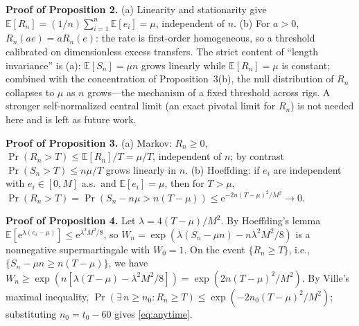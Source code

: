 \documentclass[journal]{IEEEtran}
\newcommand{\E}{\mathbb{E}}
\newcommand{\Prb}{\Pr}
\begin{document}
\textbf{Proof of Proposition 2.} (a) Linearity and stationarity give $\E[R_n]=(1/n)\sum_{i=1}^{n}\E[e_i]=\mu$, independent of $n$. (b) For $a>0$, $R_n(ae)=aR_n(e)$: the rate is first-order homogeneous, so a threshold calibrated on dimensionless excess transfers. The strict content of ``length invariance'' is (a): $\E[S_n]=\mu n$ grows linearly while $\E[R_n]=\mu$ is constant; combined with the concentration of Proposition~3(b), the null distribution of $R_n$ collapses to $\mu$ as $n$ grows---the mechanism of a fixed threshold across rigs. A stronger self-normalized central limit (an exact pivotal limit for $R_n$) is not needed here and is left as future work.

\textbf{Proof of Proposition 3.} (a) Markov: $R_n\ge0$, $\Prb(R_n>T)\le\E[R_n]/T=\mu/T$, independent of $n$; by contrast $\Prb(S_n>T)\le n\mu/T$ grows linearly in $n$. (b) Hoeffding: if $e_i$ are independent with $e_i\in[0,M]$ a.s.\ and $\E[e_i]=\mu$, then for $T>\mu$, $\Prb(R_n>T)=\Prb(S_n-n\mu>n(T-\mu))\le\mathrm{e}^{-2n(T-\mu)^2/M^2}\to0$.

\textbf{Proof of Proposition 4.} Let $\lambda=4(T-\mu)/M^2$. By Hoeffding's lemma $\E[\mathrm{e}^{\lambda(e_i-\mu)}]\le\mathrm{e}^{\lambda^2M^2/8}$, so $W_n=\exp\left(\lambda(S_n-\mu n)-n\lambda^2M^2/8\right)$ is a nonnegative supermartingale with $W_0=1$. On the event $\{R_n\ge T\}$, i.e., $\{S_n-\mu n\ge n(T-\mu)\}$, we have $W_n\ge\exp\left(n[\lambda(T-\mu)-\lambda^2M^2/8]\right)=\exp\left(2n(T-\mu)^2/M^2\right)$. By Ville's maximal inequality, $\Prb\left(\exists\,n\ge n_0: R_n\ge T\right)\le\exp\left(-2n_0(T-\mu)^2/M^2\right)$; substituting $n_0=t_0-60$ gives \eqref{eq:anytime}.
\end{document}
